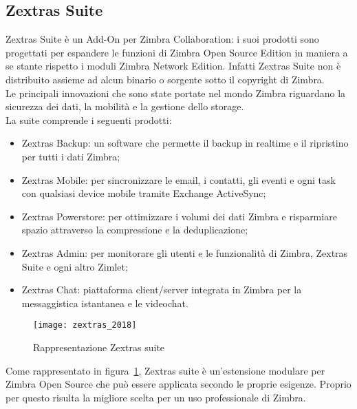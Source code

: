 \subsection{Zextras Suite}
Zextras Suite è un Add-On per Zimbra Collaboration: i suoi prodotti sono progettati per espandere le funzioni di Zimbra Open Source Edition in maniera a se stante rispetto i moduli Zimbra Network Edition. Infatti Zextras Suite non è distribuito assieme ad alcun binario o sorgente sotto il copyright di Zimbra. \\
Le principali innovazioni che sono state portate nel mondo Zimbra riguardano la sicurezza dei dati, la mobilità e la gestione dello storage.\\
La suite comprende i seguenti prodotti:
	\begin{itemize}
		\item Zextras Backup: un software che permette il backup in realtime e il ripristino per tutti i dati Zimbra;
		\item Zextras Mobile: per sincronizzare le email, i contatti, gli eventi e ogni task con qualsiasi device mobile tramite Exchange ActiveSync;
		\item Zextras Powerstore: per ottimizzare i volumi dei dati Zimbra e risparmiare spazio attraverso la compressione e la deduplicazione;
		\item Zextras Admin: per monitorare gli utenti e le funzionalità di Zimbra, Zextras Suite e ogni altro Zimlet;
		\item Zextras Chat: piattaforma client/server integrata in Zimbra per la messaggistica istantanea e le videochat.
	\end{itemize}

\begin{figure}[H] 
	\centering
	\texttt{[image: zextras\_2018]}
	\caption{Rappresentazione Zextras suite}
	\label{fig:modulizextras}
\end{figure}
Come rappresentato in figura~\ref{fig:modulizextras}, Zextras suite è un'estensione modulare per Zimbra Open Source che può essere applicata secondo le proprie esigenze. Proprio per questo risulta la migliore scelta per un uso professionale di Zimbra.

